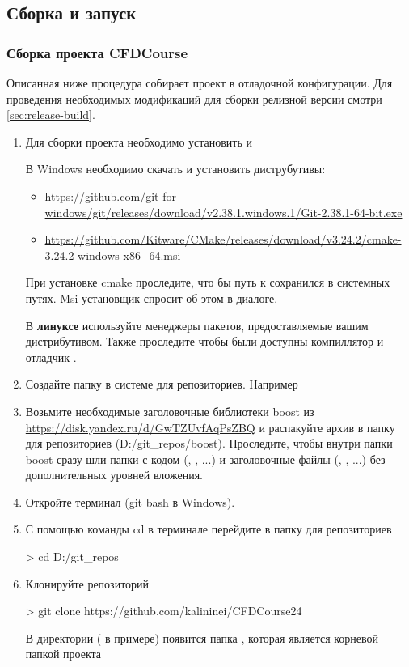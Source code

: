 \subsection{Сборка и запуск}
\subsubsection{Сборка проекта CFDCourse}

Описанная ниже процедура собирает проект в отладочной конфигурации.
Для проведения необходимых модификаций для сборки релизной версии смотри \ref{sec:release-build}.

\label{sec:install-prep}
\begin{enumerate}
\item
Для сборки проекта необходимо установить  и 

В Windows необходимо скачать и установить диструбутивы:
\begin{itemize}
\item
\url{https://github.com/git-for-windows/git/releases/download/v2.38.1.windows.1/Git-2.38.1-64-bit.exe}
\item
\url{https://github.com/Kitware/CMake/releases/download/v3.24.2/cmake-3.24.2-windows-x86\_64.msi}
\end{itemize}

При установке cmake проследите, что бы путь к  сохранился в системных путях.
Msi установщик спросит об этом в диалоге.

В {\bf линуксе} используйте менеджеры пакетов, предоставляемые вашим дистрибутивом.
Также проследите чтобы были доступны компиллятор  и отладчик .

\item
Создайте папку в системе для репозиториев. Например 

\item
Возьмите необходимые заголовочные библиотеки boost из \url{https://disk.yandex.ru/d/GwTZUvfAqPsZBQ}
и распакуйте архив в папку для репозиториев (D:/git\_repos/boost).
Проследите, чтобы внутри папки boost сразу шли папки с кодом (, , ...)
и заголовочные файлы (, , ...)
без дополнительных уровней вложения.

\item
Откройте терминал (git bash в Windows).

\item
С помощью команды cd в терминале перейдите в папку для репозиториев
\begin{shelloutput}
> cd D:/git_repos
\end{shelloutput}

\item
Клонируйте репозиторий
\begin{shelloutput}
> git clone https://github.com/kalininei/CFDCourse24
\end{shelloutput}
В директории ( в примере) появится папка , которая является корневой папкой проекта
\end{enumerate}

